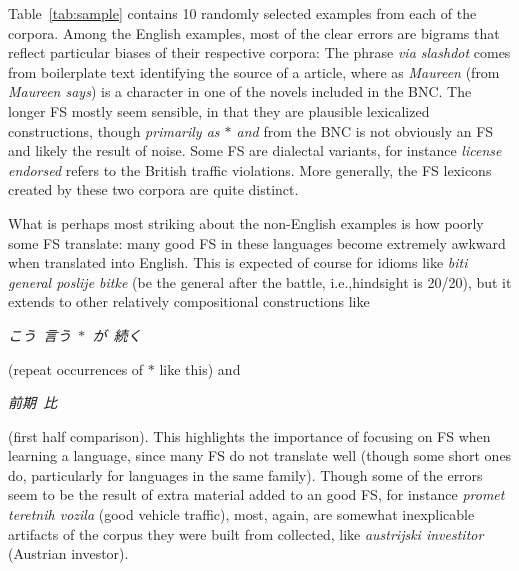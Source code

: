 \documentclass[11pt,letterpaper]{article}
\makeatletter
\def \ie {i.e.,\@ }
\newcommand{\gap}{$*$\xspace}
\newcommand{\ex}[1]{\textit{#1}\xspace}
\newcommand{\tabref}[2][]{Table#1~\ref{#2}\xspace}
\makeatother
\begin{document}
\tabref{tab:sample} contains 10 randomly selected examples from each of the corpora. Among the English examples, most of the clear errors are bigrams that reflect particular biases of their respective corpora: The phrase \ex{via slashdot} comes from boilerplate text identifying the source of a article, where as \ex{Maureen} (from \ex{Maureen says}) is a character in one of the novels included in the BNC. The longer FS mostly seem sensible, in that they are plausible lexicalized constructions, though \ex{primarily as \gap and} from the BNC is not obviously an FS and likely the result of noise. Some FS are dialectal variants, for instance \ex{license endorsed} refers to the British traffic violations. More generally, the FS lexicons created by these two corpora are quite distinct.

What is perhaps most striking about the non-English examples is how poorly some FS translate: many good FS in these languages become extremely awkward when translated into English. This is expected of course for idioms like \ex{biti general poslije bitke} (be the general after the battle, \ie hindsight is 20/20), but it extends to other relatively compositional  constructions like 
\begin{CJK*}{UTF8}{min} \ex{こう\ 言う\ \gap\ が\ 続く} \end{CJK*} 
(repeat occurrences of \gap like this) and 
\begin{CJK*}{UTF8}{min} \ex{前期\ 比} \end{CJK*} 
(first half comparison). This highlights the importance of focusing on FS when learning a language, since many FS do not translate well (though some short ones do, particularly for languages in the same family). Though some of the errors seem to be the result of extra material added to an good FS, for instance \ex{promet teretnih vozila} (good vehicle traffic), most, again, are somewhat inexplicable artifacts of the corpus they were built from collected, like \ex{austrijski investitor} (Austrian investor).
\end{document}
